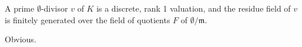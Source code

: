 A prime $\emptyset$-divisor $v$ of $K$ is a discrete, rank 1 valuation, and the residue field of $v$ is finitely generated over the field of quotients $F$ of $\emptyset/\mathfrak{m}$.

Obvious.